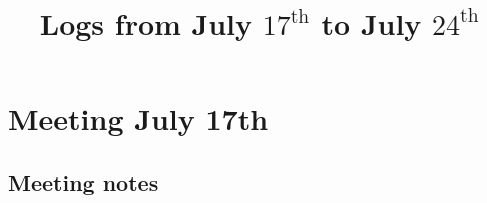 \documentclass[12pt,a4paper]{article}
\title{Logs from July $17^{\text{th}}$ to July $24^{\text{th}}$}
\author{}
\date{}
\begin{document}
\maketitle

\section{Meeting July 17th}









\subsection{Meeting notes}
\end{document}
